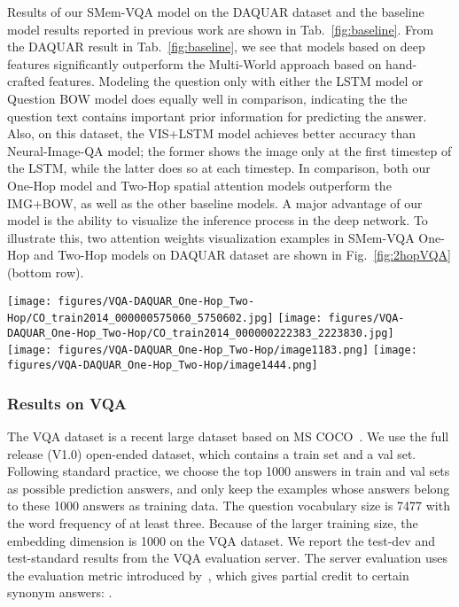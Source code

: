 Results of our SMem-VQA model on the DAQUAR dataset and the baseline model results reported in previous work are shown in Tab.~\ref{fig:baseline}. 
From the DAQUAR result in Tab.~\ref{fig:baseline}, we see that models based on deep features significantly outperform the Multi-World approach based on hand-crafted features. Modeling the question only with either the LSTM model or Question BOW model does equally well in comparison, indicating the the question text contains important prior information for predicting the answer. Also, on this dataset, the VIS+LSTM model achieves better accuracy than Neural-Image-QA model; the former shows the image only at the first timestep of the LSTM, while the latter does so at each timestep. In comparison, both our One-Hop model and Two-Hop spatial attention models outperform the IMG+BOW, as well as the other baseline models.
A major advantage of our model is the ability to visualize the inference process in the deep network. To illustrate this, two attention weights visualization examples in SMem-VQA One-Hop and Two-Hop models on DAQUAR dataset are shown in Fig.~\ref{fig:2hopVQA} (bottom row).



\begin{figure*}[t]
\texttt{[image: figures/VQA-DAQUAR\_One-Hop\_Two-Hop/CO\_train2014\_000000575060\_5750602.jpg]}
  \texttt{[image: figures/VQA-DAQUAR\_One-Hop\_Two-Hop/CO\_train2014\_000000222383\_2223830.jpg]}\\
  \texttt{[image: figures/VQA-DAQUAR\_One-Hop\_Two-Hop/image1183.png]}
  \texttt{[image: figures/VQA-DAQUAR\_One-Hop\_Two-Hop/image1444.png]}
\vspace{-0.25in}
\caption{Visualization of the spatial attention weights in the SMem-VQA One-Hop and Two-Hop models on VQA (top row) and DAQUAR (bottom row) datasets. For each image and question pair, we show the original image, the attention weights  of the One-Hop model, and the two attention weights  and  of the Two-Hop model in order.}\label{fig:2hopVQA}
\vspace{-0.15in}
\end{figure*}
\subsubsection{Results on VQA}

The VQA dataset is a recent large dataset based on MS COCO~\cite{lin2014microsoft}. We use the full release (V1.0) open-ended dataset, which contains a train set and a val set. Following standard practice, we choose the top 1000 answers in train and val sets as possible prediction answers, and only keep the examples whose answers belong to these 1000 answers as training data. The question vocabulary size is 7477 with the word frequency of at least three.
Because of the larger training size, the embedding dimension is 1000 on the VQA dataset.
We report the test-dev and test-standard results from the VQA evaluation server.
The server evaluation uses the evaluation metric introduced by~\cite{DBLP:journals/corr/AntolALMBZP15}, which gives partial credit to certain synonym answers:
.



